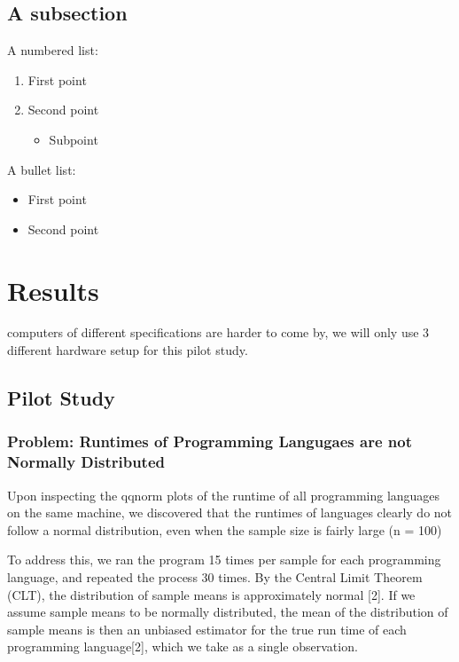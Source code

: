 \documentclass[12pt,halfline,a4paper,]{ouparticle}
\providecommand{\tightlist}{%
  \setlength{\itemsep}{0pt}\setlength{\parskip}{0pt}}
\begin{document}
\subsection{A subsection}\label{a-subsection}

A numbered list:

\begin{enumerate}
\def\labelenumi{\arabic{enumi})}
\tightlist
\item
  First point
\item
  Second point

  \begin{itemize}
  \tightlist
  \item
    Subpoint
  \end{itemize}
\end{enumerate}

A bullet list:

\begin{itemize}
\tightlist
\item
  First point
\item
  Second point
\end{itemize}

\section{Results}\label{results}

computers of different specifications are harder to come by, we will
only use 3 different hardware setup for this pilot study.

\subsection{Pilot Study}\label{pilot-study}

\subsubsection{Problem: Runtimes of Programming Langugaes are not
Normally
Distributed}\label{problem-runtimes-of-programming-langugaes-are-not-normally-distributed}

Upon inspecting the qqnorm plots of the runtime of all programming
languages on the same machine, we discovered that the runtimes of
languages clearly do not follow a normal distribution, even when the
sample size is fairly large (n = 100)

To address this, we ran the program 15 times per sample for each
programming language, and repeated the process 30 times. By the Central
Limit Theorem (CLT), the distribution of sample means is approximately
normal {[}2{]}. If we assume sample means to be normally distributed,
the mean of the distribution of sample means is then an unbiased
estimator for the true run time of each programming language{[}2{]},
which we take as a single observation.
\end{document}
